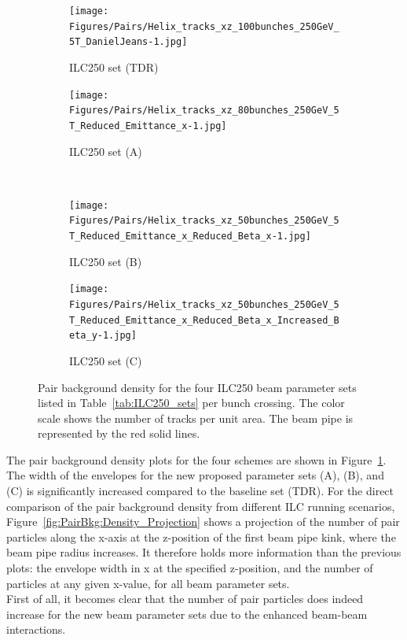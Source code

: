 \begin{figure}
\centering
\begin{subfigure}[t]{0.49\textwidth}
\centering
\texttt{[image: Figures/Pairs/Helix\_tracks\_xz\_100bunches\_250GeV\_5T\_DanielJeans-1.jpg]}
\caption{ILC250 set (TDR)}
\end{subfigure}
\hspace*{0.08cm}
\begin{subfigure}[t]{0.49\textwidth}
\centering
\texttt{[image: Figures/Pairs/Helix\_tracks\_xz\_80bunches\_250GeV\_5T\_Reduced\_Emittance\_x-1.jpg]}
\caption{ILC250 set (A)}
\end{subfigure}
\\
\begin{subfigure}[t]{0.49\textwidth}
\centering
\texttt{[image: Figures/Pairs/Helix\_tracks\_xz\_50bunches\_250GeV\_5T\_Reduced\_Emittance\_x\_Reduced\_Beta\_x-1.jpg]}
\caption{ILC250 set (B)}
\end{subfigure}
\hspace*{0.08cm}
\begin{subfigure}[t]{0.49\textwidth}
\centering
\texttt{[image: Figures/Pairs/Helix\_tracks\_xz\_50bunches\_250GeV\_5T\_Reduced\_Emittance\_x\_Reduced\_Beta\_x\_Increased\_Beta\_y-1.jpg]}
\caption{ILC250 set (C)}
\end{subfigure}
\caption[Pair background density for the proposed ILC250 beam parameter sets]{Pair background density for the four ILC250 beam parameter sets listed in Table~\ref{tab:ILC250_sets} per bunch crossing. 
The color scale shows the number of tracks per unit area.
The beam pipe is represented by the red solid lines.}
\label{fig:PairBkg:ILC250_Envelopes}
\end{figure}
The pair background density plots for the four schemes are shown in Figure~\ref{fig:PairBkg:ILC250_Envelopes}.
The width of the envelopes for the new proposed parameter sets (A), (B), and (C) is significantly increased compared to the baseline set (TDR).
For the direct comparison of the pair background density from different ILC running scenarios, Figure~\ref{fig:PairBkg:Density_Projection} shows a projection of the number of pair particles along the x-axis at the z-position of the first beam pipe kink, where the beam pipe radius increases.
It therefore holds more information than the previous plots: the envelope width in x at the specified z-position, and the number of particles at any given x-value, for all beam parameter sets.
\\First of all, it becomes clear that the number of pair particles does indeed increase for the new beam parameter sets due to the enhanced beam-beam interactions.
